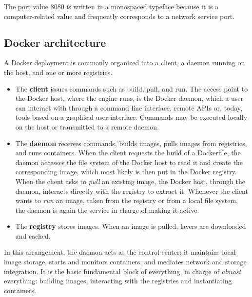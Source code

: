 The port value 8080 is written in a monospaced typeface because it is a computer-related value and frequently corresponds to a network service port.

\subsection{Docker architecture}

A Docker deployment is commonly organized into a client, a daemon running on the host, and one or more registries.

\begin{center}
\end{center}

\begin{itemize}
\item The \textbf{client} issues commands such as build, pull, and run. The access point to the Docker host, where the engine runs, is the Docker daemon, which a user can interact with through a command line interface, remote APIs or, today, tools based on a graphical user interface. Commands may be executed locally on the host or transmitted to a remote daemon.
\item The \textbf{daemon} receives commands, builds images, pulls images from registries, and runs containers. When the client requests the build of a Dockerfile, the daemon accesses the file system of the Docker host to read it and create the corresponding image, which most likely is then put in the Docker registry. When the client asks to \emph{pull} an existing image, the Docker host, through the daemon, interacts directly with the registry to extract it. Whenever the client wants to \emph{run} an image, taken from the registry or from a local file system, the daemon is again the service in charge of making it active.
\item The \textbf{registry} stores images. When an image is pulled, layers are downloaded and cached.
\end{itemize}

In this arrangement, the daemon acts as the control center: it maintains local image storage, starts and monitors containers, and mediates network and storage integration. It is the basic fundamental block of everything, in charge of \emph{almost} everything: building images, interacting with the registries and instantiating containers.

